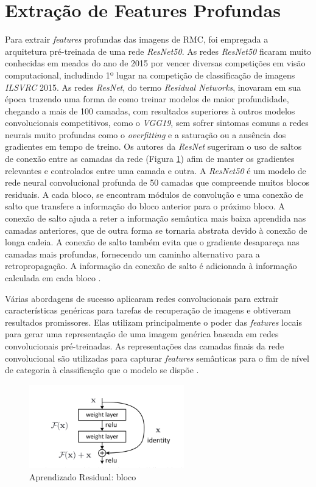 \section{Extração de Features Profundas}
Para extrair \textit{features} profundas das imagens de \gls{RMC}, foi empregada a arquitetura pré-treinada de uma rede \textit{ResNet50}. As redes \textit{ResNet50} ficaram muito conhecidas em meados do ano de 2015 por vencer diversas competições em visão computacional, includindo 1º lugar na competição de classificação de imagens \textit{ILSVRC} 2015. As redes \textit{ResNet}, do termo \textit{Residual Networks}, inovaram em sua época trazendo uma forma  de como treinar modelos de maior profundidade, chegando a mais de 100 camadas, com resultados superiores à outros modelos convolucionais competitivos, como o \textit{VGG19}, sem sofrer sintomas comuns a redes neurais muito profundas como o \textit{overfitting} e a saturação ou a ausência dos gradientes em tempo de treino. Os autores da \textit{ResNet} sugeriram o uso de saltos de conexão entre as camadas da rede (Figura \ref{fig:fig003}) afim de manter os gradientes relevantes e controlados entre uma camada e outra.  A \textit{ResNet50} é um modelo de rede neural convolucional profunda de 50 camadas que compreende muitos blocos residuais. A cada bloco, se encontram módulos de convolução e uma conexão de salto que transfere a informação do bloco anterior para o próximo bloco. A conexão de salto ajuda a reter a informação semântica mais baixa aprendida nas camadas anteriores, que de outra forma se tornaria abstrata devido à conexão de longa cadeia. A conexão de salto também evita que o gradiente desapareça nas camadas mais profundas, fornecendo um caminho alternativo para a retropropagação. A informação da conexão de salto é adicionada à informação calculada em cada bloco \cite{heDeepResidualLearning2015}.

Várias abordagens de sucesso aplicaram redes convolucionais para extrair características genéricas para tarefas de recuperação de imagens e obtiveram resultados promissores. Elas utilizam principalmente o poder das \textit{features} locais para gerar uma representação de uma imagem genérica baseada em redes convolucionais pré-treinadas. As representações das camadas finais da rede convolucional são utilizadas para capturar \textit{features} semânticas para o fim de nível de categoria à classificação que o modelo se dispõe \cite{alzubiContentbasedImageRetrieval2017b}.

\begin{figure}[htbp]
    \centering
    \includegraphics[width=0.6\textwidth]{figures/fig003.png}
    \caption{Aprendizado Residual: bloco}
    \label{fig:fig003}
\end{figure}

